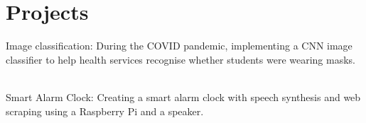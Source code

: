 
\section{Projects}

\begin{entrylist}


\minientry
{Image classification:}
{During the COVID pandemic, implementing a CNN image classifier to help health services recognise whether students were wearing masks.}

\\

\minientry
{Smart Alarm Clock:}
{Creating a smart alarm clock with speech synthesis and web scraping using a Raspberry Pi and a speaker.}

\end{entrylist}
